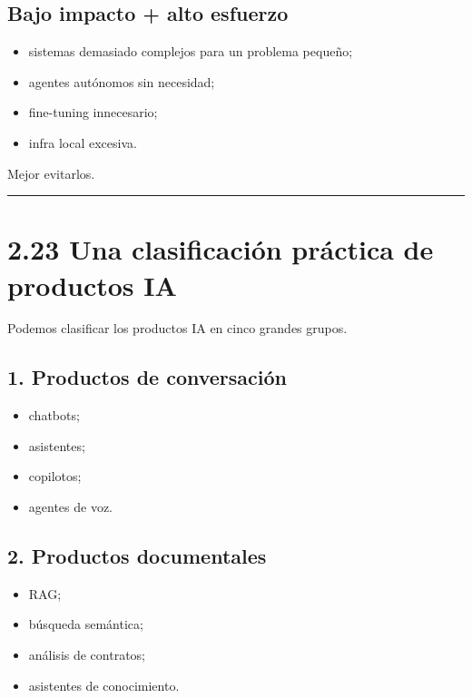 \subsection{Bajo impacto + alto
esfuerzo}\label{bajo-impacto-alto-esfuerzo}

\begin{itemize}
\tightlist
\item
  sistemas demasiado complejos para un problema pequeño;
\item
  agentes autónomos sin necesidad;
\item
  fine-tuning innecesario;
\item
  infra local excesiva.
\end{itemize}

Mejor evitarlos.

\begin{center}\rule{0.5\linewidth}{0.5pt}\end{center}

\section{2.23 Una clasificación práctica de productos
IA}\label{una-clasificaciuxf3n-pruxe1ctica-de-productos-ia}

Podemos clasificar los productos IA en cinco grandes grupos.

\subsection{1. Productos de
conversación}\label{productos-de-conversaciuxf3n}

\begin{itemize}
\tightlist
\item
  chatbots;
\item
  asistentes;
\item
  copilotos;
\item
  agentes de voz.
\end{itemize}

\subsection{2. Productos documentales}\label{productos-documentales}

\begin{itemize}
\tightlist
\item
  RAG;
\item
  búsqueda semántica;
\item
  análisis de contratos;
\item
  asistentes de conocimiento.
\end{itemize}

